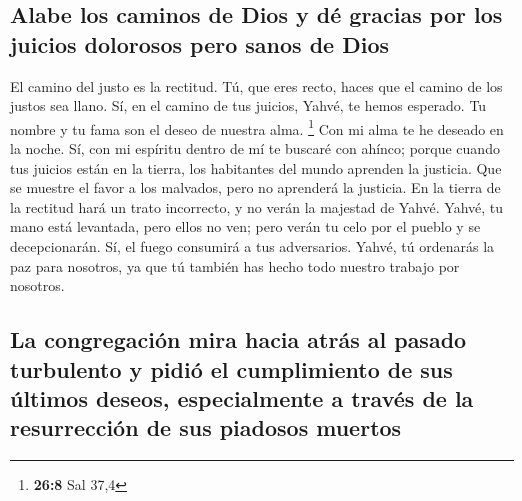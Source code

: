\begin{paracol}{2}
\hypertarget{alabe-los-caminos-de-dios-y-duxe9-gracias-por-los-juicios-dolorosos-pero-sanos-de-dios}{%
\subsection{Alabe los caminos de Dios y dé gracias por los juicios
dolorosos pero sanos de
Dios}\label{alabe-los-caminos-de-dios-y-duxe9-gracias-por-los-juicios-dolorosos-pero-sanos-de-dios}}

 El camino del justo es la rectitud. Tú, que eres recto,
haces que el camino de los justos sea llano.  Sí, en el
camino de tus juicios, Yahvé, te hemos esperado. Tu nombre y tu fama son
el deseo de nuestra alma. \footnote{\textbf{26:8} Sal 37,4}
 Con mi alma te he deseado en la noche. Sí, con mi
espíritu dentro de mí te buscaré con ahínco; porque cuando tus juicios
están en la tierra, los habitantes del mundo aprenden la justicia.
 Que se muestre el favor a los malvados, pero no
aprenderá la justicia. En la tierra de la rectitud hará un trato
incorrecto, y no verán la majestad de Yahvé.  Yahvé, tu
mano está levantada, pero ellos no ven; pero verán tu celo por el pueblo
y se decepcionarán. Sí, el fuego consumirá a tus adversarios.
 Yahvé, tú ordenarás la paz para nosotros, ya que tú
también has hecho todo nuestro trabajo por nosotros.

\hypertarget{la-congregaciuxf3n-mira-hacia-atruxe1s-al-pasado-turbulento-y-pidiuxf3-el-cumplimiento-de-sus-uxfaltimos-deseos-especialmente-a-travuxe9s-de-la-resurrecciuxf3n-de-sus-piadosos-muertos}{%
\subsection{La congregación mira hacia atrás al pasado turbulento y
pidió el cumplimiento de sus últimos deseos, especialmente a través de
la resurrección de sus piadosos
muertos}\label{la-congregaciuxf3n-mira-hacia-atruxe1s-al-pasado-turbulento-y-pidiuxf3-el-cumplimiento-de-sus-uxfaltimos-deseos-especialmente-a-travuxe9s-de-la-resurrecciuxf3n-de-sus-piadosos-muertos}}


\end{paracol}
